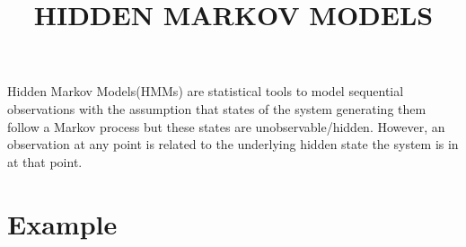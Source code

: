 \documentclass[11pt, a4paper]{article}
\begin{document}
\title{HIDDEN MARKOV MODELS}
\date{}
\maketitle

Hidden Markov Models(HMMs) are statistical tools to model sequential observations with the assumption that states of the system generating them follow a Markov process but these states are unobservable/hidden. However, an observation at any point is related to the underlying hidden state the system is in at that point.

\section{Example}
\end{document}

